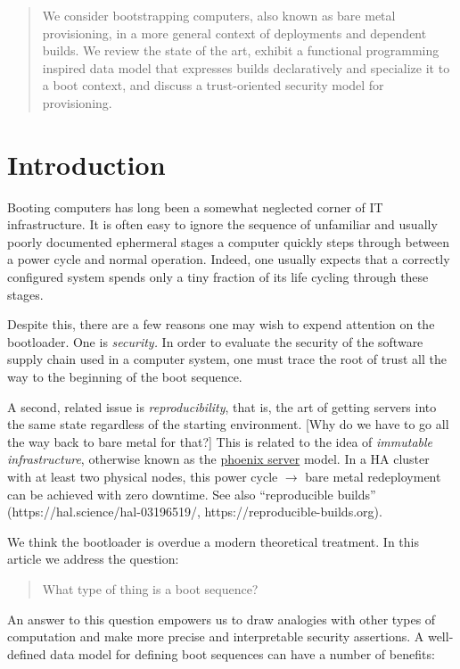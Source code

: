 \maketitle


\begin{abstract}

  We consider bootstrapping computers, also known as bare metal provisioning, in a more general context of deployments and dependent builds. We review the state of the art, exhibit a functional programming inspired data model that expresses builds declaratively and specialize it to a boot context, and discuss a trust-oriented security model for provisioning.

\end{abstract}

\section{Introduction}

Booting computers has long been a somewhat neglected corner of IT infrastructure. 
%
It is often easy to ignore the sequence of unfamiliar and usually poorly documented ephermeral stages a computer quickly steps through between a power cycle and normal operation. 
%
Indeed, one usually expects that a correctly configured system spends only a tiny fraction of its life cycling through these stages.

Despite this, there are a few reasons one may wish to expend attention on the bootloader. 
%
One is \emph{security.} 
%
In order to evaluate the security of the software supply chain used in a computer system, one must trace the root of trust all the way to the beginning of the boot sequence.

A second, related issue is \emph{reproducibility}, that is, the art of getting servers into the same state regardless of the starting environment. {[}Why do we have to go all the way back to bare metal for
that?{]} 
%
This is related to the idea of \emph{immutable infrastructure},
otherwise known as the
\href{https://martinfowler.com/bliki/PhoenixServer.html}{phoenix server}
model. In a HA cluster with at least two physical nodes, this power
cycle \(\rightarrow\) bare metal redeployment can be achieved with zero
downtime. See also ``reproducible builds''
(https://hal.science/hal-03196519/, https://reproducible-builds.org).

We think the bootloader is overdue a modern theoretical treatment. 
%
In this article we address the question:
\begin{quote}
  What type of thing is a boot sequence?
\end{quote}
%
An answer to this question empowers us to draw analogies with other types of computation and make more precise and interpretable security assertions.
%
A well-defined data model for defining boot sequences can have a number of benefits:

